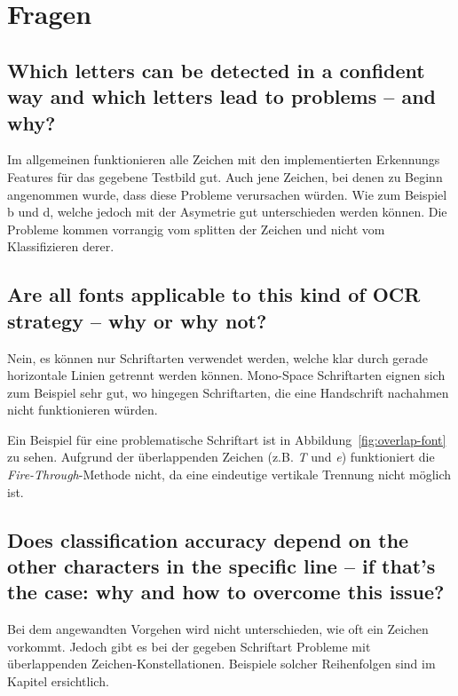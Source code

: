 \section{Fragen}

\subsection{Which letters can be detected in a confident way and which letters lead to problems – and why?}
Im allgemeinen funktionieren alle Zeichen mit den implementierten Erkennungs Features für das gegebene Testbild gut. Auch jene Zeichen, bei denen zu Beginn angenommen wurde, dass diese Probleme verursachen würden. Wie zum Beispiel
b und d, welche jedoch mit der Asymetrie gut unterschieden werden können. Die Probleme kommen vorrangig vom splitten der Zeichen und nicht vom Klassifizieren derer.

\subsection{Are all fonts applicable to this kind of OCR strategy – why or why not?}
Nein, es können nur Schriftarten verwendet werden, welche klar durch gerade horizontale Linien getrennt werden können. Mono-Space Schriftarten eignen
sich zum Beispiel sehr gut, wo hingegen Schriftarten, die eine Handschrift nachahmen nicht funktionieren würden.

Ein Beispiel für eine problematische Schriftart ist in Abbildung~\ref{fig:overlap-font} zu sehen. Aufgrund der überlappenden Zeichen (z.B. \textit{T} und \textit{e}) funktioniert die \textit{Fire-Through}-Methode nicht, da eine eindeutige vertikale Trennung nicht möglich ist.



\subsection{Does classification accuracy depend on the other characters in the specific line – if that’s the case: why and how to overcome this issue?}
Bei dem angewandten Vorgehen wird nicht unterschieden, wie oft ein Zeichen vorkommt. Jedoch gibt es bei der gegeben Schriftart Probleme mit überlappenden
Zeichen-Konstellationen. Beispiele solcher Reihenfolgen sind im Kapitel  ersichtlich. \\


